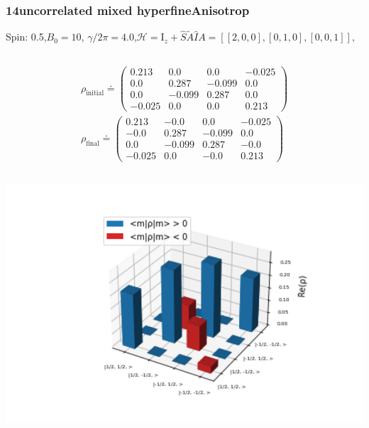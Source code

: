 \documentclass[10pt]{beamer}
\begin{document}
\begin{frame}
\frametitle{14uncorrelated mixed hyperfineAnisotrop}
Spin: 0.5,$B_0= 10$, $\gamma/2\pi = 4.0$,$\mathcal{H}=\text{I}_{z}+ \hat{S}\tilde{A}\hat{I}$$A=[[2, 0, 0], [0, 1, 0], [0, 0, 1]]$,
\begin{columns}[T]
\begin{column}{.5\textwidth}
\begin{align*}
\rho_{\text{initial}}\doteq
\begin{pmatrix}
0.213 & 0.0 & 0.0 & -0.025 \\
0.0 & 0.287 & -0.099 & 0.0 \\
0.0 & -0.099 & 0.287 & 0.0 \\
-0.025 & 0.0 & 0.0 & 0.213
\end{pmatrix}
\\
\rho_{\text{final}}\doteq
\begin{pmatrix}
0.213 & -0.0 & 0.0 & -0.025 \\
-0.0 & 0.287 & -0.099 & 0.0 \\
0.0 & -0.099 & 0.287 & -0.0 \\
-0.025 & 0.0 & -0.0 & 0.213
\end{pmatrix}
\end{align*}
\begin{column}{.5\textwidth}
\includegraphics[width=1.5\textwidth]{./spin1-2/14uncorrelated_mixed_hyperfineAnisotrop/InitialRealPartDensityMatrix.png}
\end{column}
\begin{column}{.5\textwidth}

\end{column}
\end{column}
\end{columns}$$
\end{frame}
\end{document}
